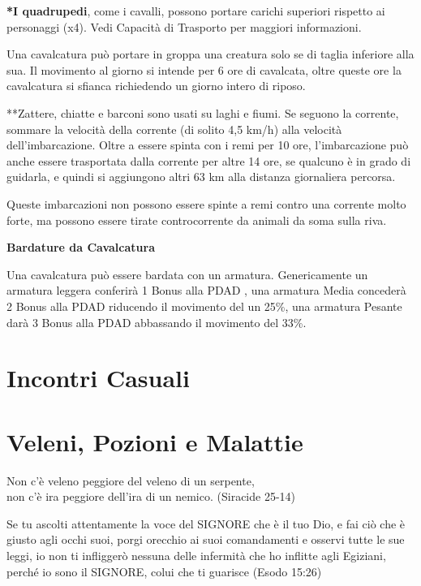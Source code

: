 \documentclass[12pt,a4paper,twoside,openany]{book}
\begin{document}
\begin{multicols}{2}

\bigskip

\textbf{*I quadrupedi}, come i cavalli, possono portare carichi superiori rispetto ai personaggi (x4). Vedi Capacità di Trasporto per maggiori informazioni.

Una cavalcatura può portare in groppa una creatura solo se di taglia inferiore alla sua. Il movimento al giorno si intende per 6 ore di cavalcata, oltre queste ore la cavalcatura si sfianca richiedendo un giorno intero di riposo.

**Zattere, chiatte e barconi sono usati su laghi e fiumi. Se seguono la corrente, sommare la velocità della corrente (di solito 4,5 km/h) alla velocità dell'imbarcazione. Oltre a essere spinta con i remi per 10 ore, l'imbarcazione può anche essere trasportata dalla corrente per altre 14 ore, se qualcuno è in grado di guidarla, e quindi si aggiungono altri 63 km alla distanza giornaliera percorsa.

Queste imbarcazioni non possono essere spinte a remi contro una corrente molto forte, ma possono essere tirate controcorrente da animali da soma sulla riva.

\textbf{Bardature da Cavalcatura}

Una cavalcatura può essere bardata con un armatura. Genericamente un armatura leggera conferirà 1 Bonus alla PDAD , una armatura Media concederà 2 Bonus alla PDAD riducendo il movimento del un 25\%, una armatura Pesante darà 3 Bonus alla PDAD abbassando il movimento del 33\%.

\end{multicols}

\section{Incontri Casuali}

\pagebreak
\section{Veleni, Pozioni e Malattie}

\label{veleni-e-pozioni}


\begin{changemargin}{0.3cm}{0.3cm}\begin{enfasi}{
Non c'è veleno peggiore del veleno di un serpente,\\
non c'è ira peggiore dell'ira di un nemico. (Siracide 25-14)\\\medskip

Se tu ascolti attentamente la voce del SIGNORE che è il tuo Dio, e fai ciò che è giusto agli occhi suoi, porgi orecchio ai suoi comandamenti e osservi tutte le sue leggi, io non ti infliggerò nessuna delle infermità che ho inflitte agli Egiziani, perché io sono il SIGNORE, colui che ti guarisce (Esodo 15:26)
}\end{enfasi}\end{changemargin}\medskip
\end{document}
